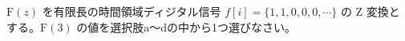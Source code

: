 $\textrm{F}(z)$ を有限長の時間領域ディジタル信号 $f[i] = \{1, 1, 0, 0, 0, \cdots \}$ の Z 変換とする。$\textrm{F}(3)$ の値を選択肢a〜dの中から1つ選びなさい。
